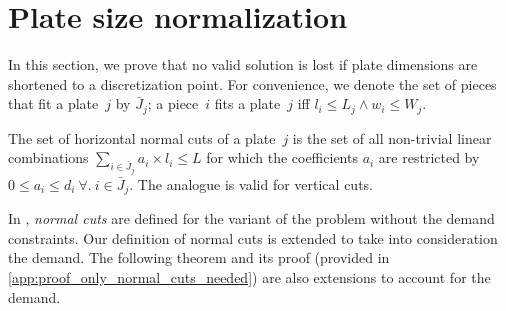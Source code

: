 



\section{Plate size normalization}

In this section, we prove that no valid solution is lost if plate dimensions are shortened to a discretization point.
For convenience, we denote the set of pieces that fit a plate~\(j\) by \(\bar{J}_j\); a piece~\(i\) fits a plate~\(j\) iff \(l_i \leq L_j \land w_i \leq W_j\).%


\begin{definition}
The set of horizontal normal cuts of a plate~\(j\) is the set of all non-trivial linear combinations \(\sum_{i \in \bar{J}_j} a_i \times l_i \leq L\) for which the coefficients \(a_i\) are restricted by \(0 \leq a_i \leq d_i~\forall.~i \in \bar{J}_j\). The analogue is valid for vertical cuts.
\end{definition}

In \cite{nicos:1977}, \emph{normal cuts} are defined for the variant of the problem without the demand constraints.
Our definition of normal cuts is extended to take into consideration the demand.
The following theorem and its proof (provided in \autoref{app:proof_only_normal_cuts_needed}) are also extensions to account for the demand.

